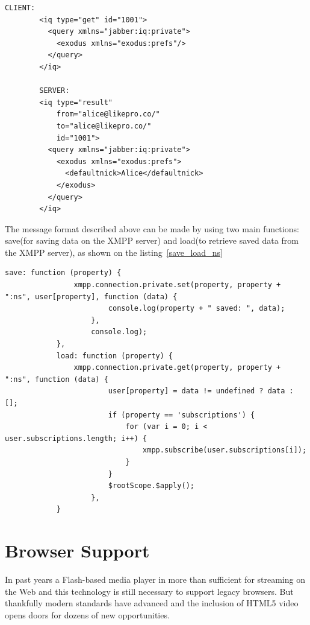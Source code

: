      \begin{lstlisting}[label=client_load,caption=Client Retrieves Private Data]
		CLIENT:
		<iq type="get" id="1001">
		  <query xmlns="jabber:iq:private">
		    <exodus xmlns="exodus:prefs"/>
		  </query>
		</iq>

		SERVER:
		<iq type="result"
		    from="alice@likepro.co/"
		    to="alice@likepro.co/"
		    id="1001">
		  <query xmlns="jabber:iq:private">
		    <exodus xmlns="exodus:prefs">
		      <defaultnick>Alice</defaultnick>
		    </exodus>
		  </query>
		</iq>
    \end{lstlisting}

    The message format described above can be made by using two main functions: save(for saving data on the XMPP server) and load(to retrieve saved data from the XMPP server), as shown on the listing~\ref{save_load_ns}
	\begin{lstlisting}[label=save_load_ns,caption=Snippet of Save/Load preferences to a private namespace]
	      	save: function (property) {
	            xmpp.connection.private.set(property, property + ":ns", user[property], function (data) {
	                    console.log(property + " saved: ", data);
	                },
	                console.log);
	        },
	        load: function (property) {
	            xmpp.connection.private.get(property, property + ":ns", function (data) {
	                    user[property] = data != undefined ? data : [];
	                    if (property == 'subscriptions') {
	                        for (var i = 0; i < user.subscriptions.length; i++) {
	                            xmpp.subscribe(user.subscriptions[i]);
	                        }
	                    }
	                    $rootScope.$apply();
	                },
	        }
	\end{lstlisting}


\section{Browser Support}
	In past years a Flash-based media player in more than sufficient for streaming on the Web and this technology is still necessary to support legacy browsers. But thankfully modern standards have advanced and the inclusion of HTML5 video opens doors for dozens of new opportunities.

